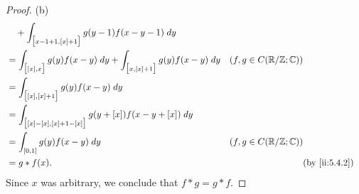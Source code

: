 \begin{proof}{(b)}
\begin{align*}
     & \quad + \int_{\big[x - 1 + 1, [x] + 1\big]} g(y - 1) f(x - y - 1) \; dy                                                                      \\
     & = \int_{\big[[x], x\big]} g(y) f(x - y) \; dy + \int_{\big[x, [x] + 1\big]} g(y) f(x - y) \; dy & (f, g \in C(\R / \Z ; \C))                 \\
     & = \int_{\big[[x], [x] + 1\big]} g(y) f(x - y) \; dy                                                                                          \\
     & = \int_{\big[[x] - [x], [x] + 1 - [x]\big]} g(y + [x]) f(x - y + [x]) \; dy                                                                  \\
     & = \int_{[0, 1]} g(y) f(x - y) \; dy                                                             & (f, g \in C(\R / \Z ; \C))                 \\
     & = g * f(x).                                                                                     &                            & \by{ii:5.4.2}
  \end{align*}
  Since \(x\) was arbitrary, we conclude that \(f * g = g * f\).
\end{proof}

